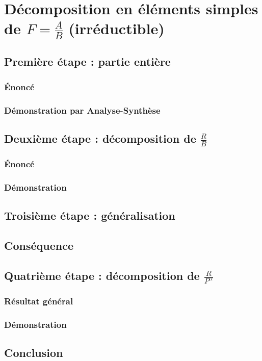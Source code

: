 \documentclass[12pt,a4paper,french]{book}
\begin{document}
	\section{Décomposition en éléments simples de $F = \frac{A}{B}$ (irréductible)}
		\subsection{Première étape : partie entière}
			\subsubsection{Énoncé}
			\subsubsection{Démonstration par Analyse-Synthèse}
		\subsection{Deuxième étape : décomposition de $\frac{R}{B}$}
			\subsubsection{Énoncé}
			\subsubsection{Démonstration}
		\subsection{Troisième étape : généralisation}
		\subsection{Conséquence}
		\subsection{Quatrième étape : décomposition de $\frac{R}{P^{\alpha}}$}
			\subsubsection{Résultat général}
			\subsubsection{Démonstration}
		\subsection{Conclusion}
\end{document}
